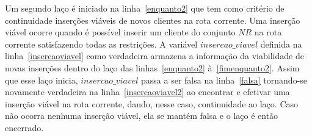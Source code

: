 Um segundo laço  é iniciado na linha~\ref{enquanto2} que tem como critério de continuidade inserções viáveis de novos clientes na rota corrente. Uma inserção viável ocorre quando é possível inserir um cliente do conjunto $NR$ na rota corrente satisfazendo todas as restrições. A variável $insercao\_viavel$ definida na linha~\ref{insercaoviavel} como verdadeira armazena a informação da viabilidade de novas inserções dentro do laço das linhas~\ref{enquanto2} à~\ref{fimenquanto2}. Assim que esse laço inicia, $insercao\_viavel$ passa a ser falsa na linha~\ref{falsa} tornando-se novamente verdadeira na linha~\ref{insercaoviavel2} ao encontrar e efetivar uma inserção viável na rota corrente, dando, nesse caso, continuidade ao laço. Caso não ocorra nenhuma inserção viável, ela se mantém falsa e o laço é então encerrado.